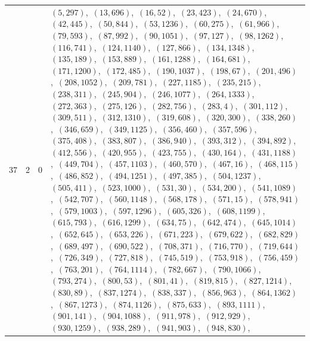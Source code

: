 \documentclass[11pt]{article}
\begin{document}
\begin{longtable}{@{}rrl>{\raggedright\arraybackslash}p{}@{}}
37 & 2 & $0$ & $(5,297)$,\allowbreak\ $(13,696)$,\allowbreak\ $(16,52)$,\allowbreak\ $(23,423)$,\allowbreak\ $(24,670)$,\allowbreak\ $(42,445)$,\allowbreak\ $(50,844)$,\allowbreak\ $(53,1236)$,\allowbreak\ $(60,275)$,\allowbreak\ $(61,966)$,\allowbreak\ $(79,593)$,\allowbreak\ $(87,992)$,\allowbreak\ $(90,1051)$,\allowbreak\ $(97,127)$,\allowbreak\ $(98,1262)$,\allowbreak\ $(116,741)$,\allowbreak\ $(124,1140)$,\allowbreak\ $(127,866)$,\allowbreak\ $(134,1348)$,\allowbreak\ $(135,189)$,\allowbreak\ $(153,889)$,\allowbreak\ $(161,1288)$,\allowbreak\ $(164,681)$,\allowbreak\ $(171,1200)$,\allowbreak\ $(172,485)$,\allowbreak\ $(190,1037)$,\allowbreak\ $(198,67)$,\allowbreak\ $(201,496)$,\allowbreak\ $(208,1052)$,\allowbreak\ $(209,781)$,\allowbreak\ $(227,1185)$,\allowbreak\ $(235,215)$,\allowbreak\ $(238,311)$,\allowbreak\ $(245,904)$,\allowbreak\ $(246,1077)$,\allowbreak\ $(264,1333)$,\allowbreak\ $(272,363)$,\allowbreak\ $(275,126)$,\allowbreak\ $(282,756)$,\allowbreak\ $(283,4)$,\allowbreak\ $(301,112)$,\allowbreak\ $(309,511)$,\allowbreak\ $(312,1310)$,\allowbreak\ $(319,608)$,\allowbreak\ $(320,300)$,\allowbreak\ $(338,260)$,\allowbreak\ $(346,659)$,\allowbreak\ $(349,1125)$,\allowbreak\ $(356,460)$,\allowbreak\ $(357,596)$,\allowbreak\ $(375,408)$,\allowbreak\ $(383,807)$,\allowbreak\ $(386,940)$,\allowbreak\ $(393,312)$,\allowbreak\ $(394,892)$,\allowbreak\ $(412,556)$,\allowbreak\ $(420,955)$,\allowbreak\ $(423,755)$,\allowbreak\ $(430,164)$,\allowbreak\ $(431,1188)$,\allowbreak\ $(449,704)$,\allowbreak\ $(457,1103)$,\allowbreak\ $(460,570)$,\allowbreak\ $(467,16)$,\allowbreak\ $(468,115)$,\allowbreak\ $(486,852)$,\allowbreak\ $(494,1251)$,\allowbreak\ $(497,385)$,\allowbreak\ $(504,1237)$,\allowbreak\ $(505,411)$,\allowbreak\ $(523,1000)$,\allowbreak\ $(531,30)$,\allowbreak\ $(534,200)$,\allowbreak\ $(541,1089)$,\allowbreak\ $(542,707)$,\allowbreak\ $(560,1148)$,\allowbreak\ $(568,178)$,\allowbreak\ $(571,15)$,\allowbreak\ $(578,941)$,\allowbreak\ $(579,1003)$,\allowbreak\ $(597,1296)$,\allowbreak\ $(605,326)$,\allowbreak\ $(608,1199)$,\allowbreak\ $(615,793)$,\allowbreak\ $(616,1299)$,\allowbreak\ $(634,75)$,\allowbreak\ $(642,474)$,\allowbreak\ $(645,1014)$,\allowbreak\ $(652,645)$,\allowbreak\ $(653,226)$,\allowbreak\ $(671,223)$,\allowbreak\ $(679,622)$,\allowbreak\ $(682,829)$,\allowbreak\ $(689,497)$,\allowbreak\ $(690,522)$,\allowbreak\ $(708,371)$,\allowbreak\ $(716,770)$,\allowbreak\ $(719,644)$,\allowbreak\ $(726,349)$,\allowbreak\ $(727,818)$,\allowbreak\ $(745,519)$,\allowbreak\ $(753,918)$,\allowbreak\ $(756,459)$,\allowbreak\ $(763,201)$,\allowbreak\ $(764,1114)$,\allowbreak\ $(782,667)$,\allowbreak\ $(790,1066)$,\allowbreak\ $(793,274)$,\allowbreak\ $(800,53)$,\allowbreak\ $(801,41)$,\allowbreak\ $(819,815)$,\allowbreak\ $(827,1214)$,\allowbreak\ $(830,89)$,\allowbreak\ $(837,1274)$,\allowbreak\ $(838,337)$,\allowbreak\ $(856,963)$,\allowbreak\ $(864,1362)$,\allowbreak\ $(867,1273)$,\allowbreak\ $(874,1126)$,\allowbreak\ $(875,633)$,\allowbreak\ $(893,1111)$,\allowbreak\ $(901,141)$,\allowbreak\ $(904,1088)$,\allowbreak\ $(911,978)$,\allowbreak\ $(912,929)$,\allowbreak\ $(930,1259)$,\allowbreak\ $(938,289)$,\allowbreak\ $(941,903)$,\allowbreak\ $(948,830)$,\allowbreak\ 
\end{longtable}
\end{document}
